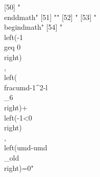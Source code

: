  [50] "\\end{dmath}"                                                                                                                                                                                                                                                                                                                                                                                                                                                                                
 [51] ""                                                                                                                                                                                                                                                                                                                                                                                                                                                                                            
 [52] "%
 [53] "\\begin{dmath}"                                                                                                                                                                                                                                                                                                                                                                                                                                                                              
 [54] "\\left(-1\\geq 0\\right)\\, \\left(\\frac{{umd}}{-1^{2}}-{{l\\_6}}\\right)+\\left(-1<0\\right)\\, \\left({umd}-{{umd\\_old}}\\right)=0"                                                                                                                                                                                                                                                                                                                                                      

